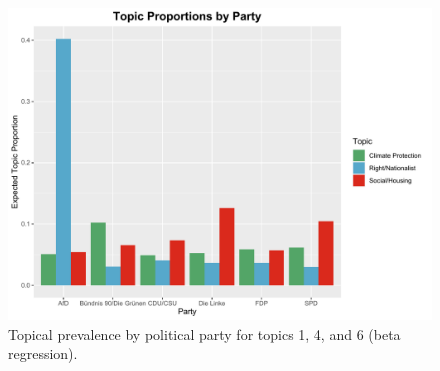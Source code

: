 \begin{figure}[h!]
  \centering
  \captionsetup{justification=centering,margin=2cm}
  \includegraphics[scale = 0.5]{../plots/appendix/5_1/beta_t146_cat.pdf}
  \caption{Topical prevalence by political party for topics 1, 4, and 6 (beta regression).}
  \label{fig:boat1}
\end{figure}

